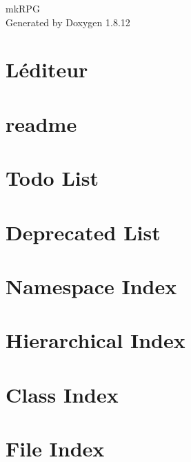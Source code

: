 \documentclass[twoside]{book}
\newcommand{\+}{\discretionary{\mbox{\scriptsize$\hookleftarrow$}}{}{}}
\newcommand{\clearemptydoublepage}{%
  \newpage{\pagestyle{empty}\cleardoublepage}%
}
\begin{document}
\hypersetup{pageanchor=false,
             bookmarksnumbered=true,
             pdfencoding=unicode
            }
\begin{titlepage}
\vspace*{7cm}
\begin{center}%
{\Large mk\+R\+PG }\\
\vspace*{1cm}
{\large Generated by Doxygen 1.8.12}\\
\end{center}
\end{titlepage}
\clearemptydoublepage
{}
\tableofcontents
\clearemptydoublepage
{}
\hypersetup{pageanchor=true}

\chapter{L\textquotesingle{}éditeur}
\label{md_src_editor__r_e_a_d_m_e}
\hypertarget{md_src_editor__r_e_a_d_m_e}{}

\chapter{readme}
\label{md_src_readme}
\hypertarget{md_src_readme}{}

\chapter{Todo List}
\label{todo}
\hypertarget{todo}{}

\chapter{Deprecated List}
\label{deprecated}
\hypertarget{deprecated}{}

\chapter{Namespace Index}

\chapter{Hierarchical Index}

\chapter{Class Index}

\chapter{File Index}

\end{document}
